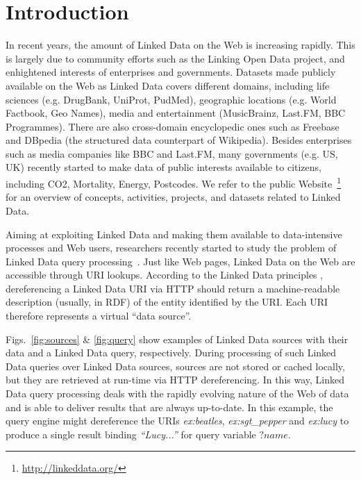 \section{Introduction}
\label{sec:linked_data} 

In recent years, the amount of Linked Data on the Web is increasing
rapidly. This is largely due to community efforts such as the Linking
Open Data project, and enhightened interests of enterprises and
governments. Datasets made publicly available on the Web as Linked
Data covers different domains, including life sciences (e.g. DrugBank,
UniProt, PudMed), geographic locations (e.g. World Factbook, Geo
Names), media and entertainment (MusicBrainz, Last.FM, BBC
Programmes). There are also cross-domain encyclopedic ones such as
Freebase and DBpedia (the structured data counterpart of
Wikipedia). Besides enterprises such as media companies like BBC and
Last.FM, many governments (e.g. US, UK) recently started to make data
of public interests available to citizens, including CO2, Mortality,
Energy, Postcodes. We refer to the public
Website~\footnote{\url{http://linkeddata.org/}} for an overview of
concepts, activities, projects, and datasets related to Linked Data.

Aiming at exploiting Linked Data and making them available to
data-intensive processes and Web users, researchers recently started
to study the problem of Linked Data query
processing~\cite{hartig_executing_2009,harth_data_2010,ladwig_linked_2010}. Just
like Web pages, Linked Data on the Web are accessible through URI
lookups. According to the Linked Data principles
\cite{bizer_linked_2009}, dereferencing a Linked Data URI via HTTP
should return a machine-readable description (usually, in RDF) of the
entity identified by the URI. Each URI therefore represents a virtual
``data source''. 

Figs.~\ref{fig:sources} \& \ref{fig:query} show examples of Linked
Data sources with their data and a Linked Data query,
respectively. During processing of such Linked Data queries over
Linked Data sources, sources are not stored or cached locally, but
they are retrieved at run-time via HTTP dereferencing. In this way,
Linked Data query processing deals with the rapidly evolving nature of
the Web of data and is able to deliver results that are always
up-to-date. In this example, the query engine might dereference the
URIs \emph{ex:beatles}, \emph{ex:sgt\_pepper} and \emph{ex:lucy} to
produce a single result binding \emph{``Lucy...''} for query variable
$?name$.

